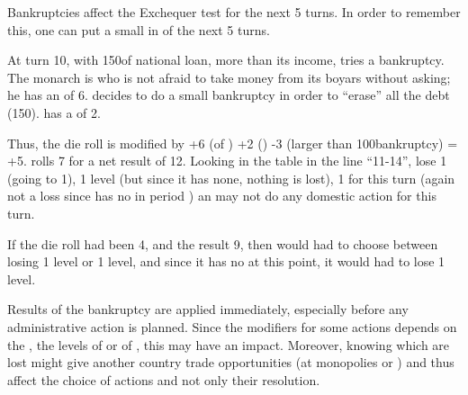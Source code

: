 \begin{playtip}
  Bankruptcies affect the Exchequer test for the next 5 turns. In order to
  remember this, one can put a small \textetoile in  of the next 5 turns.
\end{playtip}

\begin{exemple}
  At turn 10, with 150\ducats of national loan, more than its income, \RUS
  tries a bankruptcy. The monarch is  who is not afraid to
  take money from its boyars without asking; he has an \ADM of 6. \RUS decides
  to do a small bankruptcy in order to ``erase'' all the debt
  (150\ducats). \RUS has a \STAB of 2.

  Thus, the die roll is modified by +6 (\ADM of ) +2 (\STAB)
  -3 (larger than 100\ducats bankruptcy) = +5. \RUS rolls 7 for a net result
  of 12. Looking in the table in the line ``11-14'', \RUS lose 1 \STAB (going
  to 1), 1 \TradeFLEET level (but since it has none, nothing is lost), 1\TFI
  for this turn (again not a loss since \RUS has no \TFI in period
  ) an may not do any domestic action for this turn.

  If the die roll had been 4, and the result 9, then \RUS would had to choose
  between losing 1 \TradeFLEET level or 1 \MNU level, and since it has no
  \TradeFLEET at this point, it would had to lose 1 \MNU level.
\end{exemple}


\aparag Results of the bankruptcy are applied immediately, especially before
any administrative action is planned.
\bparag Since the modifiers for some actions depends on the \STAB, the levels
of \TradeFLEET or of \MNU, this may have an impact.
\bparag Moreover, knowing which \TradeFLEET are lost might give another
country trade opportunities (at monopolies or ) and thus
affect the choice of actions and not only their resolution.

